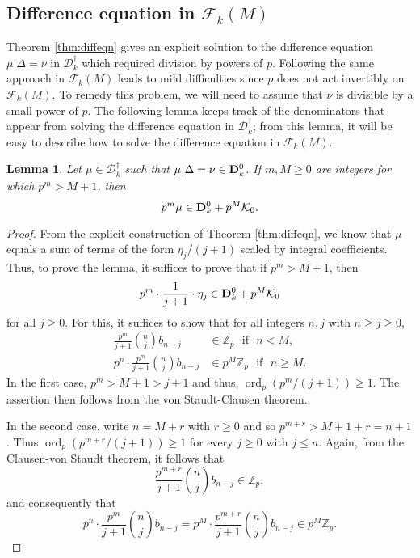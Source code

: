 \documentclass{amsart}
\theoremstyle{plain}
\newtheorem{lemma}[thm]{Lemma}
\theoremstyle{definition}
\newcommand{\D}{{\mathcal D}}
\newcommand{\bD}{{\bf D}}
\newcommand{\F}{{\mathcal F}}
\newcommand{\K}{{\mathcal K}}
\newcommand{\Z}{{\mathbb Z}}
\newcommand{\Zp}{\Z_p}
\renewcommand{\binom}[2]{\genfrac{(}{)}{0pt}{}{#1}{#2}}
\newcommand{\Dvrig}[1]{\bD_{#1}}
\newcommand{\Dkrig}{\Dvrig{k}}
\newcommand{\Dkoc}{\D_k^\dag}
\newcommand{\FkM}{\F_k(M)}
\DeclareMathOperator{\ord}{ord}
\begin{document}
\subsection{Difference equation in $\FkM$}

Theorem \ref{thm:diffeqn} gives an explicit solution to the
difference equation $\mu \big| \Delta = \nu$ in $\Dkoc$ which
required division by powers of $p$.  Following the same approach
in $\FkM$ leads to mild difficulties since $p$ does not act
invertibly on $\FkM$. To remedy this problem, we will need to
assume that $\nu$ is divisible by a small power of $p$. The following lemma keeps track of the denominators that appear from solving the difference equation in $\Dkoc$; from this lemma, it will be easy to describe how to solve the difference equation in $\FkM$.


\begin{lemma}
\label{lemma:denom} Let $\mu \in \Dkoc$ such that $\mu\big| \Delta = \nu \in \Dkrig^0$.  If $m,M \geq 0$ are integers for which $p^m > M+1$, then
$$
p^m \mu \in \Dkrig^0 + p^M \K_0.
$$
\end{lemma}

\begin{proof}
From the explicit construction of Theorem \ref{thm:diffeqn}, we
know that $\mu$ equals a sum of terms of the form $\eta_j/(j+1)$
scaled by integral coefficients. Thus, to prove the lemma, it
suffices to prove that if $p^m>M+1$, then 
$$
p^m\cdot \frac{1}{j+1}\cdot \eta_j \in \Dkrig^0 + p^M\K_0
$$
for all $j\ge 0$.  For this, it suffices to show that for all integers $n,j$ with $n\ge j \ge 0$,
\begin{align*}
\frac{p^m}{j+1} \binom{n}{j} b_{n-j} &\in \Zp \text{~~if~~} n < M, \\
p^n \cdot \frac{p^m}{j+1} \binom{n}{j} b_{n-j} &\in p^M \Zp \text{~~if~~} n \geq M.
\end{align*}
In the first case, $p^m > M+1> j+1$ and thus, $\ord_p(p^m/(j+1)) \ge 1$.  The assertion then follows from the von Staudt-Clausen theorem.

In the second case, write $n = M+r$ with $r\ge
0$ and so $p^{m+r}>M+1+r = n+1$.  Thus $\ord_p(p^{m+r}/(j+1))\ge 1$ for every
$j\ge 0$ with $j\le n$.  Again, from the Clausen-von Staudt theorem, it follows that
$$
\frac{p^{m+r}}{j+1}\binom{n}{j} b_{n-j}\in \Zp,
$$
and consequently that
$$
p^n\cdot \frac{p^m}{j+1} \binom{n}{j} b_{n-j}  = p^M \cdot \frac{p^{m+r}}{j+1}
\binom{n}{j} b_{n-j} \in p^M\Zp.
$$
\end{proof}
\end{document}
